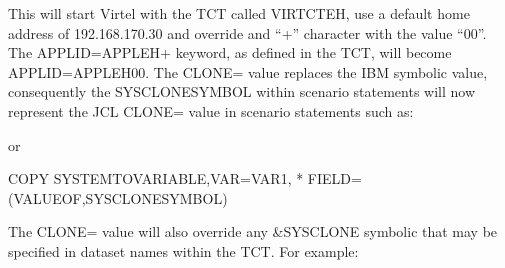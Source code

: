 \documentclass[letterpaper,10pt,english]{sphinxmanual}
\begin{document}
\begin{sphinxVerbatim}[commandchars=\\\{\}]
  
\end{sphinxVerbatim}

\sphinxAtStartPar
This will start Virtel with the TCT called VIRTCTEH, use a default home address of 192.168.170.30 and override and “+” character with the value “00”. The APPLID=APPLEH+ keyword, as defined in the TCT, will become APPLID=APPLEH00. The CLONE= value replaces the IBM symbolic value, consequently the SYSCLONE\sphinxhyphen{}SYMBOL within scenario statements will now represent the JCL CLONE= value in scenario statements such as:\sphinxhyphen{}

\begin{sphinxVerbatim}[commandchars=\\\{\}]
 
\end{sphinxVerbatim}

\sphinxAtStartPar
or

\begin{sphinxVerbatim}[commandchars=\\\{\}]
COPY\PYGZdl{} SYSTEM\PYGZhy{}TO\PYGZhy{}VARIABLE,VAR=\PYGZsq{}VAR1\PYGZsq{},                    *
  FIELD=(VALUE\PYGZhy{}OF,SYSCLONE\PYGZhy{}SYMBOL)
\end{sphinxVerbatim}

\sphinxAtStartPar
The CLONE= value will also override any \&SYSCLONE symbolic that may be specified in dataset names within the TCT. For example:\sphinxhyphen{}

\begin{sphinxVerbatim}[commandchars=\\\{\}]
                  
                          
\end{sphinxVerbatim}
\end{document}
